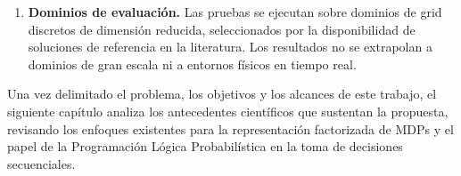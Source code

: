 \begin{enumerate}
    \item \textbf{Dominios de evaluación.} Las pruebas se ejecutan sobre
    dominios de grid discretos de dimensión reducida, seleccionados por
    la disponibilidad de soluciones de referencia en la literatura. Los
    resultados no se extrapolan a dominios de gran escala ni a entornos
    físicos en tiempo real.
\end{enumerate}

Una vez delimitado el problema, los objetivos y los alcances de este trabajo, el siguiente capítulo analiza los antecedentes científicos que sustentan la propuesta, revisando los enfoques existentes para la representación factorizada de MDPs y el papel de la Programación Lógica Probabilística en la toma de decisiones secuenciales.
